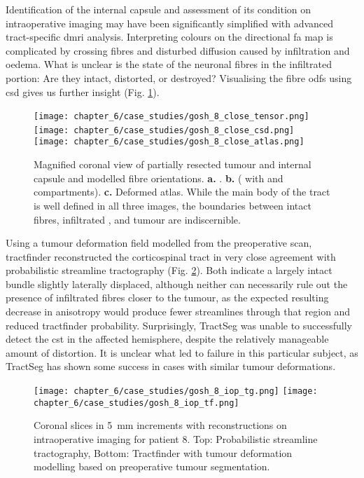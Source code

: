 \documentclass[12pt,phd,a4paper,twoside]{ucl_thesis}
\begin{document}
Identification of the internal capsule and assessment of its condition on intraoperative imaging may have been significantly simplified with advanced tract-specific \gls{dmri} analysis.
Interpreting colours on the directional \gls{fa} map is complicated by crossing fibres and disturbed diffusion caused by infiltration and oedema.
What is unclear is the state of the neuronal fibres in the infiltrated portion: Are they intact, distorted, or destroyed?
Visualising the fibre \glspl{odf} using \gls{csd} gives us further insight (Fig. \ref{fig:8i_fod}).

\begin{figure}
  \centering
  \texttt{[image: chapter\_6/case\_studies/gosh\_8\_close\_tensor.png]}\,\texttt{[image: chapter\_6/case\_studies/gosh\_8\_close\_csd.png]}\,\texttt{[image: chapter\_6/case\_studies/gosh\_8\_close\_atlas.png]}
  \caption[GOSH iMRI patient 8, intraoperative imaging, internal capsule detail]{Magnified coronal view of partially resected tumour and internal capsule and modelled fibre orientations.
  \textbf{\sffamily a.} .
  \textbf{\sffamily b.}   (  with  and  compartments).
  \textbf{\sffamily c.} Deformed   atlas. While the main body of the tract is well defined in all three images, the boundaries between intact fibres, infiltrated , and tumour are indiscernible.}
  \label{fig:8i_fod}
\end{figure}

Using a tumour deformation field modelled from the preoperative scan, tractfinder reconstructed the corticospinal tract in very close agreement with probabilistic streamline tractography (Fig. \ref{fig:8i_tf}).
Both indicate a largely intact bundle slightly laterally displaced, although neither can necessarily rule out the presence of infiltrated fibres closer to the tumour, as the expected resulting decrease in anisotropy would produce fewer streamlines through that region and reduced tractfinder probability.
Surprisingly, TractSeg was unable to successfully detect the \gls{cst} in the affected hemisphere, despite the relatively manageable amount of distortion.
It is unclear what led to failure in this particular subject, as TractSeg has shown some success in cases with similar tumour deformations\autocite{Moshe2022}.

\begin{figure}
\texttt{[image: chapter\_6/case\_studies/gosh\_8\_iop\_tg.png]}
  \texttt{[image: chapter\_6/case\_studies/gosh\_8\_iop\_tf.png]}
  \caption[GOSH iMRI patient 8, intraoperative imaging, corticospinal tract reconstructions]{Coronal slices in 5~mm increments with  reconstructions on intraoperative imaging for patient 8. Top: Probabilistic streamline tractography, Bottom: Tractfinder  with tumour deformation modelling based on preoperative tumour segmentation.}
  \label{fig:8i_tf}
\end{figure}
\end{document}
